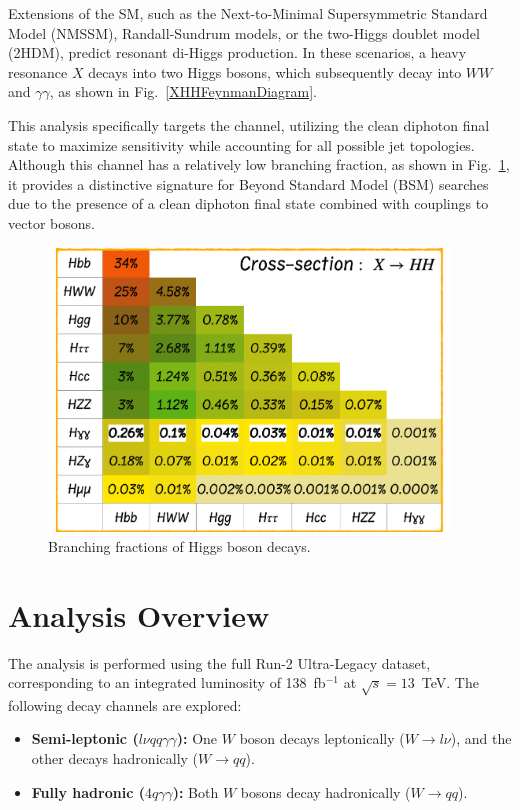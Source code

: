 Extensions of the SM, such as the Next-to-Minimal Supersymmetric Standard Model (NMSSM), Randall-Sundrum models, or the two-Higgs
doublet model (2HDM), predict resonant di-Higgs production. In these scenarios, a heavy resonance \(X\) decays into two Higgs
bosons, which subsequently decay into \(WW\) and \(\gamma\gamma\), as shown in Fig.~\ref{XHHFeynmanDiagram}.

This analysis specifically targets the \HHWW channel, utilizing the clean diphoton final state to maximize sensitivity while accounting for all possible jet topologies.
Although this channel has a relatively low branching fraction, as shown in Fig.~\ref{fig:HH_BF},
it provides a distinctive signature for Beyond Standard Model (BSM) searches due to
the presence of a clean diphoton final state combined with couplings to vector bosons.

\begin{figure}[!htbp]
    \centering
    \includegraphics[width=0.95\textwidth]{figures/diHiggsSearches/HH_BF.pdf}
    \caption{Branching fractions of Higgs boson decays.}
    \label{fig:HH_BF}
\end{figure}


\section{Analysis Overview}
The analysis is performed using the full Run-2 Ultra-Legacy dataset, corresponding to an integrated luminosity of 138~fb\(^{-1}\) at
\(\sqrt{s} = 13\)~TeV. The following decay channels are explored:
\begin{itemize}
    \item \textbf{Semi-leptonic (\(l\nu qq\gamma\gamma\)):} One \(W\) boson decays leptonically (\(W \to l\nu\)), and the other
    decays hadronically (\(W \to qq\)).
    \item \textbf{Fully hadronic (\(4q\gamma\gamma\)):} Both \(W\) bosons decay hadronically (\(W \to qq\)).
\end{itemize}

